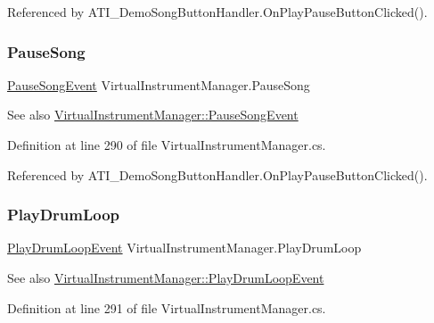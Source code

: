 Referenced by A\+T\+I\+\_\+\+Demo\+Song\+Button\+Handler.\+On\+Play\+Pause\+Button\+Clicked().

\mbox{\label{group___v_i_m_events_gae2d76fc98161d7a4573628dbd93e7887}} 
\subsubsection{\texorpdfstring{Pause\+Song}{PauseSong}}
{\footnotesize\ttfamily \hyperlink{group___v_i_m_event_types_class_virtual_instrument_manager_1_1_pause_song_event}{Pause\+Song\+Event} Virtual\+Instrument\+Manager.\+Pause\+Song}

\begin{DoxySeeAlso}{See also}
\hyperlink{group___v_i_m_event_types_class_virtual_instrument_manager_1_1_pause_song_event}{Virtual\+Instrument\+Manager\+::\+Pause\+Song\+Event} 
\end{DoxySeeAlso}


Definition at line 290 of file Virtual\+Instrument\+Manager.\+cs.



Referenced by A\+T\+I\+\_\+\+Demo\+Song\+Button\+Handler.\+On\+Play\+Pause\+Button\+Clicked().

\mbox{\label{group___v_i_m_events_ga5657ff4bcc7de6d240d7092ffd22a6fe}} 
\subsubsection{\texorpdfstring{Play\+Drum\+Loop}{PlayDrumLoop}}
{\footnotesize\ttfamily \hyperlink{group___v_i_m_event_types_class_virtual_instrument_manager_1_1_play_drum_loop_event}{Play\+Drum\+Loop\+Event} Virtual\+Instrument\+Manager.\+Play\+Drum\+Loop}

\begin{DoxySeeAlso}{See also}
\hyperlink{group___v_i_m_event_types_class_virtual_instrument_manager_1_1_play_drum_loop_event}{Virtual\+Instrument\+Manager\+::\+Play\+Drum\+Loop\+Event} 
\end{DoxySeeAlso}


Definition at line 291 of file Virtual\+Instrument\+Manager.\+cs.



